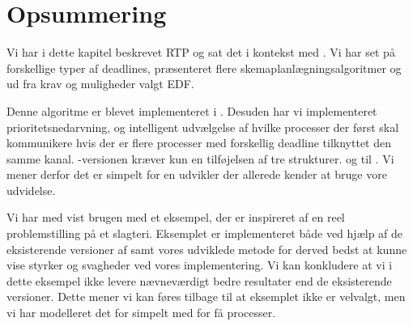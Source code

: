 \section{Opsummering}
Vi har i dette kapitel beskrevet RTP og sat det i kontekst med \pycsp. Vi har set på forskellige typer af deadlines, præsenteret flere skemaplanlægningsalgoritmer og ud fra krav og muligheder valgt EDF. 

Denne algoritme er blevet implementeret i \pycsp. Desuden har vi implementeret prioritetsnedarvning, og intelligent udvælgelse af hvilke processer der først skal kommunikere hvis der er flere processer med forskellig deadline tilknyttet den  samme kanal. -versionen kræver kun en tilføjelsen af tre strukturer.  og  til \pycsp. Vi mener derfor det er simpelt for en udvikler der allerede kender \pycsp at bruge vore udvidelse.

Vi har med vist brugen med et eksempel,  der er inspireret af en reel problemstilling på et slagteri. Eksemplet er implementeret både ved hjælp af de eksisterende versioner af \pycsp  samt vores udviklede metode for derved bedst at kunne vise styrker og svagheder ved vores implementering. Vi kan konkludere at vi i dette eksempel ikke levere nævneværdigt bedre resultater end de eksisterende versioner. Dette mener vi kan føres tilbage til at eksemplet ikke er velvalgt, men vi har modelleret det for simpelt med for få processer. 






